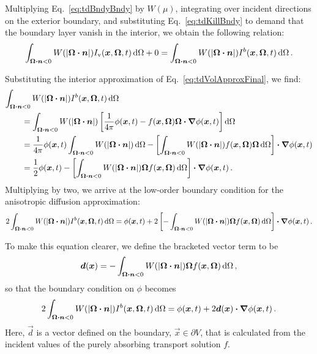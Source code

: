 Multiplying Eq.~\eqref{eq:tdBndyBndy} by $W(\mu)$, integrating over incident
directions on the exterior boundary, and substituting
Eq.~\eqref{eq:tdKillBndy} to demand that the boundary layer vanish in the
interior, we obtain
the following relation:
\begin{equation*}
  \int_{\bm{\Omega}\bm{\cdot}\bm{n} < 0}
  W(\left| \bm{\Omega}\bm{\cdot}\bm{n} \right|)
I_\mathrm{v}(\bm{x},\bm{\Omega},t) \mathop{}\!\mathrm{d}\Omega
+ 0
= 
  \int_{\bm{\Omega}\bm{\cdot}\bm{n} < 0}
  W(\left| \bm{\Omega}\bm{\cdot}\bm{n} \right|)
I^b(\bm{x},\bm{\Omega},t) \mathop{}\!\mathrm{d}\Omega \,.
\end{equation*}

\thesisclearpage

Substituting the interior approximation of Eq.~\eqref{eq:tdVolApproxFinal}, we find:
\begin{align*} \nonumber
\lefteqn{\int_{\vec{\Omega}\vd\vec{n} < 0} W(\abs{\vec{\Omega}\vd\vec{n}})
I^b(\vec{x},\vec{\Omega},t) \ud\Omega}
\qquad&
\\ \nonumber
&= 
\int_{\vec{\Omega}\vd\vec{n} < 0}
W(\abs{\vec{\Omega}\vd\vec{n}})
\left[  \frac{1}{4\pi} \phi (\vec{x},t)
  - f(\vec{x}, \vec{\Omega})\vec{\Omega}\vd \grad \phi(\vec{x},t)
\right] \ud \Omega
\\ \nonumber
&=
\frac{1}{4\pi} \phi(\vec{x},t)
\int_{\vec{\Omega}\vd\vec{n} < 0} W(\abs{\vec{\Omega}\vd\vec{n}}) \ud\Omega
- \left[ \int_{\vec{\Omega}\vd\vec{n} < 0}  W(\abs{\vec{\Omega}\vd\vec{n}})
f(\vec{x}, \vec{\Omega})\vec{\Omega} \ud\Omega\right] \vd \grad \phi(\vec{x},t)
\\
&= \frac{1}{2} \phi(\vec{x},t)
- \left[ \int_{\vec{\Omega}\vd\vec{n} < 0} W(\abs{\vec{\Omega}\vd\vec{n}})
\vec{\Omega} f(\vec{x}, \vec{\Omega}) \ud\Omega\right] \vd \grad \phi(\vec{x},t)\,.
\end{align*}
Multiplying by two, we arrive at the low-order boundary condition for the
anisotropic diffusion approximation:
\begin{equation*}
2\int_{\bm{\Omega}\bm{\cdot}\bm{n} < 0} W(\left| \bm{\Omega}\bm{\cdot}\bm{n} \right|)
I^b(\bm{x},\bm{\Omega},t) \mathop{}\!\mathrm{d}\Omega
=
\phi(\bm{x},t)
+ 2 \left[ -\int_{\bm{\Omega}\bm{\cdot}\bm{n} < 0} W(\left| \bm{\Omega}\bm{\cdot}\bm{n} \right|)
\bm{\Omega} f(\bm{x}, \bm{\Omega}) \mathop{}\!\mathrm{d}\Omega\right] \bm{\cdot} \bm{\nabla} \phi(\bm{x},t)\,.
\end{equation*}

To make this equation clearer, we define the bracketed vector term to be
\begin{equation}\label{eq:adBoundaryIntegral}
  \bm{d}(\bm{x}) = -\int_{\bm{\Omega}\bm{\cdot}\bm{n} < 0} W(\left| \bm{\Omega}\bm{\cdot}\bm{n} \right|)
\bm{\Omega} f(\bm{x}, \bm{\Omega}) \mathop{}\!\mathrm{d}\Omega\,,
\end{equation}
so that the boundary condition on $\phi$ becomes
\begin{equation} \label{eq:loBc}
2\int_{\bm{\Omega}\bm{\cdot}\bm{n} < 0} W(\left| \bm{\Omega}\bm{\cdot}\bm{n} \right|)
I^b(\bm{x},\bm{\Omega},t) \mathop{}\!\mathrm{d}\Omega
=
\phi(\bm{x},t)
+ 2 \bm{d}(\bm{x}) \bm{\cdot} \bm{\nabla} \phi(\bm{x},t)\,.
\end{equation}
Here, $\vec{d}$ is a vector defined on the boundary, $\vec{x} \in \partial V$,
that is calculated from the incident values of the purely absorbing
transport solution $f$.

